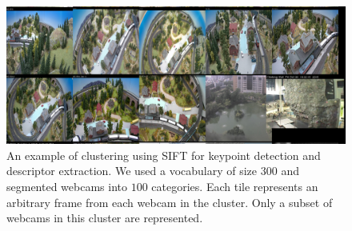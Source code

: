 \documentclass{article}
\begin{document}
\begin{figure}[h]
  \centering
  \includegraphics[scale = 0.32, angle = 90]{SameScene}
  \caption{An example of clustering using SIFT for keypoint detection and
  descriptor extraction. We used a vocabulary of size $300$ and segmented
webcams into $100$ categories. Each tile represents an arbitrary frame from each
webcam in the cluster. Only a subset of webcams in this cluster are
represented.}
  \label{Fig:SameScene}
\end{figure}
\end{document}

